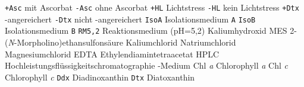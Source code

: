                 {\texttt{+Asc}}
                {mit Ascorbat}
                {\texttt{-Asc}}
                {ohne Ascorbat}
                {\texttt{+HL}}
                {Lichtstress}
                {\texttt{-HL}}
                {kein Lichtstress}
                {\texttt{+Dtx}}
                {-angereichert}
                {\texttt{-Dtx}}
                {nicht -angereichert}
                {\texttt{IsoA}}
                {Isolationsmedium \texttt{A}}
                {\texttt{IsoB}}
                {Isolationsmedium \texttt{B}}
                {\texttt{RM5,2}}
                {Reaktionsmedium (pH=5,2)}
                {}
                {Kaliumhydroxid}
                {MES}
                {2-(\textit{N}-Morpholino)ethansulfonsäure}
                {}
                {Kaliumchlorid}
                {}
                {Natriumchlorid}
                {}
                {Magnesiumchlorid}
                {EDTA}
                {Ethylendiamintetraacetat}
                {HPLC}
                {Hochleistungsflüssigkeitschromatographie}
                {}
                {-Medium}
                {Chl \textit{a}}
                {Chlorophyll \textit{a}}
                {Chl \textit{c}}
                {Chlorophyll \textit{c}}
                {\texttt{Ddx}}
                {Diadinoxanthin}
                {\texttt{Dtx}}
                {Diatoxanthin}
